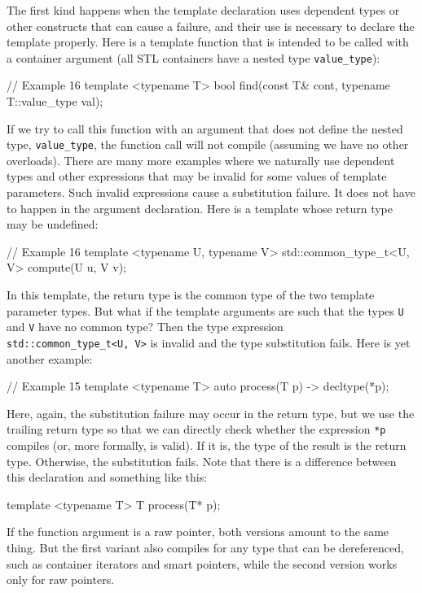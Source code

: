 The first kind happens when the template declaration uses dependent types or other constructs that can cause a failure, and their use is necessary to declare the template properly. Here is a template function that is intended to be called with a container argument (all STL containers have a nested type \texttt{value\_type}):

\begin{code}
// Example 16
template <typename T>
bool find(const T& cont, typename T::value_type val);
\end{code}

If we try to call this function with an argument that does not define the nested type, \texttt{value\_type}, the function call will not compile (assuming we have no other overloads). There are many more examples where we naturally use dependent types and other expressions that may be invalid for some values of template parameters. Such invalid expressions cause a substitution failure. It does not have to happen in the argument declaration. Here is a template whose return type may be undefined:

\begin{code}
// Example 16
template <typename U, typename V>
std::common_type_t<U, V> compute(U u, V v);
\end{code}

In this template, the return type is the common type of the two template parameter types. But what if the template arguments are such that the types \texttt{U} and \texttt{V} have no common type? Then the type expression \texttt{std::common\_type\_t\textless{}U,\ V\textgreater{}} is invalid and the type substitution fails. Here is yet another example:

\begin{code}
// Example 15
template <typename T>
auto process(T p) -> decltype(*p);
\end{code}

Here, again, the substitution failure may occur in the return type, but we use the trailing return type so that we can directly check whether the expression \texttt{*p} compiles (or, more formally, is valid). If it is, the type of the result is the return type. Otherwise, the substitution fails. Note that there is a difference between this declaration and something like this:

\begin{code}
template <typename T> T process(T* p);
\end{code}

If the function argument is a raw pointer, both versions amount to the same thing. But the first variant also compiles for any type that can be dereferenced, such as container iterators and smart pointers, while the second version works only for raw pointers.

